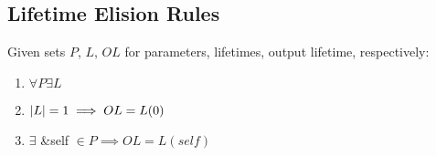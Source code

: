 \subsection*{Lifetime Elision Rules} 
Given sets $P$, $L$, $OL$ for parameters, lifetimes, output lifetime, respectively:
\begin{enumerate}
    \item $\forall P \exists L $ 
    \item $\lvert L\rvert = 1 \implies OL = L(0)$ \\ 
    \item $\exists$ \&self $\in P \implies OL = L(self)$ \\ 
\end{enumerate} \